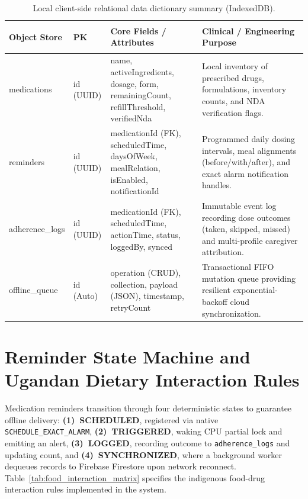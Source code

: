 \begin{table}[!htbp]
  \centering
  \caption{Local client-side relational data dictionary summary (IndexedDB).}
  \label{tab:data_dictionary}
  \footnotesize
  \setlength{\tabcolsep}{3.5pt}
  \begin{tabularx}{\textwidth}{@{} >{\bfseries\raggedright\arraybackslash}p{2.4cm} >{\ttfamily\raggedright\arraybackslash}p{1.6cm} >{\raggedright\arraybackslash}p{4.4cm} >{\raggedright\arraybackslash}X @{}}
    \toprule
    \textbf{Object Store} & \textbf{PK} & \textbf{Core Fields / Attributes} & \textbf{Clinical / Engineering Purpose} \\
    \midrule
    medications & id (UUID) & name, activeIngredients, dosage, form, remainingCount, refillThreshold, verifiedNda & Local inventory of prescribed drugs, formulations, inventory counts, and NDA verification flags. \\
    \midrule
    reminders & id (UUID) & medicationId (FK), scheduledTime, daysOfWeek, mealRelation, isEnabled, notificationId & Programmed daily dosing intervals, meal alignments (before/with/after), and exact alarm notification handles. \\
    \midrule
    adherence\_logs & id (UUID) & medicationId (FK), scheduledTime, actionTime, status, loggedBy, synced & Immutable event log recording dose outcomes (taken, skipped, missed) and multi-profile caregiver attribution. \\
    \midrule
    offline\_queue & id (Auto) & operation (CRUD), collection, payload (JSON), timestamp, retryCount & Transactional FIFO mutation queue providing resilient exponential-backoff cloud synchronization. \\
    \bottomrule
  \end{tabularx}
\end{table}

\section{Reminder State Machine and Ugandan Dietary Interaction Rules}
\label{app:tables}

Medication reminders transition through four deterministic states to guarantee offline delivery: \textbf{(1)~SCHEDULED}, registered via native \texttt{SCHEDULE\_EXACT\_ALARM}, \textbf{(2)~TRIGGERED}, waking CPU partial lock and emitting an alert, \textbf{(3)~LOGGED}, recording outcome to \texttt{adherence\_logs} and updating count, and \textbf{(4)~SYNCHRONIZED}, where a background worker dequeues records to Firebase Firestore upon network reconnect. Table~\ref{tab:food_interaction_matrix} specifies the indigenous food-drug interaction rules implemented in the system.

